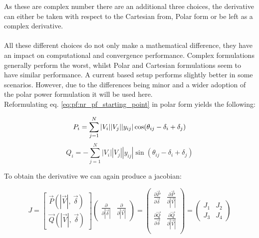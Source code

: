 As these are complex number there are an additional three choices, the derivative can either be taken
with respect to the Cartesian from, Polar form or be left as a complex derivative.\\
\\
All these different choices do not only make a mathematical difference, they have an impact
on computational and convergence performance\autocite{newton_raphson_setup_choices}. Complex formulations
generally perform the worst, whilst Polar and Cartesian formulations seem to have similar performance.
A current based setup performs slightly better in some scenarios\autocite{newton_raphson_setup_choices}.
However, due to the differences being minor and a wider adoption of the polar power formulation it will be used
here.\\

Reformulating eq. \ref{eq:pf:nr_pf_starting_point} in polar form yields the following:

\begin{equation}
    P_i = \sum_{j=1}^N |V_i||V_j||y_{ij}| \cos(\theta_{ij} - \delta_i + \delta_j)\\
    \label{eq:pf:nr_pf_p}
\end{equation}
\begin{equation}
    Q_i = -\sum_{j=1}^N |V_i||V_j||y_{ij}| \sin(\theta_{ij} - \delta_i + \delta_j)
    \label{eq:pf:nr_pf_q}
\end{equation}

To obtain the derivative we can again produce a jacobian:

\begin{equation}
    J =  
    \begin{bmatrix}
        \vec{P}(|\vec{V}|, \ \vec{\delta})\\
        \vec{Q}(|\vec{V}|, \ \vec{\delta})
    \end{bmatrix}
    \begin{pmatrix}
        \frac{\partial}{\partial |\vec{\delta}|} & \frac{\partial}{\partial |\vec{V}|}
    \end{pmatrix}
    =
    \begin{pmatrix}
        \frac{\partial \vec{P}}{\partial \vec{\delta}} & \frac{\partial \vec{P} }{\partial |\vec{V}|}\\
        \frac{\partial \vec{Q}}{\partial \vec{\delta}} & \frac{\partial \vec{Q} }{\partial |\vec{V}|}\\
    \end{pmatrix}
    =
    \begin{pmatrix}
        J_1 & J_2\\
        J_3 & J_4
    \end{pmatrix}
    \label{eq:pf:nr_pf_jacobi}
\end{equation}

